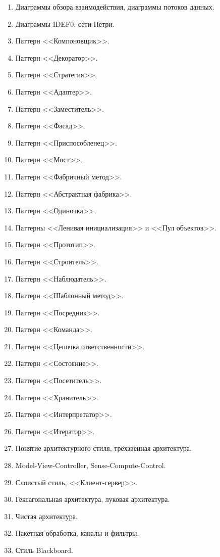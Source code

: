 \documentclass[a5paper]{article}
\begin{document}
\begin{enumerate}
    \item Диаграммы обзора взаимодействия, диаграммы потоков данных.
    \item Диаграммы IDEF0, сети Петри. 
    \item Паттерн <<Компоновщик>>.
    \item Паттерн <<Декоратор>>.
    \item Паттерн <<Стратегия>>.
    \item Паттерн <<Адаптер>>.
    \item Паттерн <<Заместитель>>.
    \item Паттерн <<Фасад>>.
    \item Паттерн <<Приспособленец>>.
    \item Паттерн <<Мост>>.
    \item Паттерн <<Фабричный метод>>.
    \item Паттерн <<Абстрактная фабрика>>.
    \item Паттерн <<Одиночка>>.
    \item Паттерны <<Ленивая инициализация>> и <<Пул объектов>>.
    \item Паттерн <<Прототип>>.
    \item Паттерн <<Строитель>>.
    \item Паттерн <<Наблюдатель>>.
    \item Паттерн <<Шаблонный метод>>.
    \item Паттерн <<Посредник>>.
    \item Паттерн <<Команда>>.
    \item Паттерн <<Цепочка ответственности>>.
    \item Паттерн <<Состояние>>.
    \item Паттерн <<Посетитель>>.
    \item Паттерн <<Хранитель>>.
    \item Паттерн <<Интерпретатор>>.
    \item Паттерн <<Итератор>>.
    \item Понятие архитектурного стиля, трёхзвенная архитектура.
    \item Model-View-Controller, Sense-Compute-Control.
    \item Слоистый стиль, <<Клиент-сервер>>.
    \item Гексагональная архитектура, луковая архитектура.
    \item Чистая архитектура.
    \item Пакетная обработка, каналы и фильтры. 
    \item Стиль Blackboard.

\end{enumerate}
\end{document}
